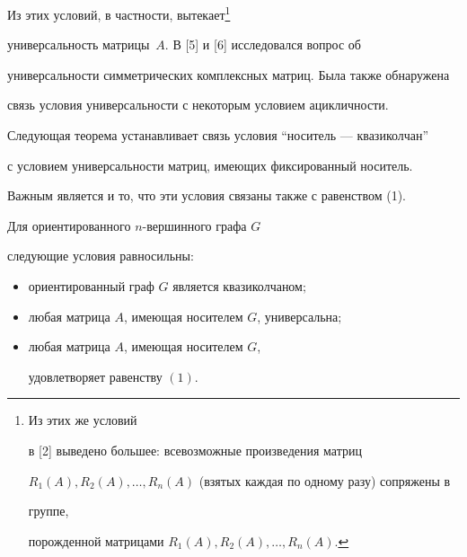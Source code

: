 Из этих условий, в частности, вытекает\footnote{Из этих же условий 


в [2] выведено большее: всевозможные произведения матриц 


$R_1(A),R_2(A),\dotsc,R_n(A)$ (взятых каждая по одному разу) сопряжены в 


группе, 


порожденной матрицами $R_1(A),R_2(A),\dotsc,R_n(A)$.} 


универсальность матрицы~$A$. В [5] и [6] исследовался вопрос об 


универсальности симметрических комплексных матриц. Была также обнаружена 


связь условия универсальности с некоторым условием ацикличности.  


Следующая теорема устанавливает связь условия ``носитель --- квазиколчан'' 


с условием универсальности матриц, имеющих фиксированный носитель.  


Важным является и то, что эти условия связаны также с равенством (1). 


 


 


\begin{thm} 


Для ориентированного $n$-вершинного графа $G$ 


следующие условия равносильны\/${:}$ 


\begin{itemize} 


\item[(i)] ориентированный граф $G$ является квазиколчаном$;$ 


\item[(ii)] любая матрица $A$, имеющая носителем $G$, универсальна\/$;$ 


\item[(iii)] любая матрица $A$, имеющая носителем $G$, 


удовлетворяет равенству $(1)$. 


\end{itemize} 


\end{thm} 


 


